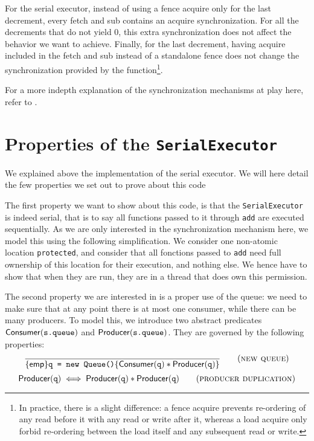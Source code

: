 For the serial executor, instead of using a fence acquire only for the last decrement, every fetch and sub contains an acquire synchronization. For all the decrements that do not yield 0, this extra synchronization does not affect the behavior we want to achieve. Finally, for the last decrement, having acquire included in the fetch and sub instead of a standalone fence does not change the synchronization provided by the function\footnote{In practice, there is a slight difference: a fence acquire prevents re-ordering of any read before it with any read or write after it, whereas a load acquire only forbid re-ordering between the load itself and any subsequent read or write.}.

For a more indepth explanation of the synchronization mechanisms at play here, refer to \cite{fsl}.


\section{Properties of the \texttt{SerialExecutor}}
We explained above the implementation of the serial executor. We will here detail the few properties we set out to prove about this code

The first property we want to show about this code, is that the \texttt{Serial\-Executor} is indeed serial, that is to say all functions passed to it through \texttt{add} are executed sequentially. As we are only interested in the synchronization mechanism here, we model this using the following simplification. We consider one non-atomic location \texttt{protected}, and consider that all fonctions passed to \texttt{add} need full ownership of this location for their execution, and nothing else. We hence have to show that when they are run, they are in a thread that does own this permission.

The second property we are interested in is a proper use of the queue: we need to make sure that at any point there is at most one consumer, while there can be many producers. To model this, we introduce two abstract predicates $\mathsf{Consumer}(\texttt{s.queue})$ and $\mathsf{Producer}(\texttt{s.queue})$. They are governed by the following properties:
\begin{equation}
		\frac{}{\{\mathsf{emp}\} \texttt{q = new Queue()} \{\mathsf{Consumer}(\texttt{q}) * \mathsf{Producer}(\texttt{q})\}} 
		\tag{\textsc{new queue}} 
		\label{eq:nQ}
\end{equation}
\begin{equation}
		\mathsf{Producer}(\texttt{q}) \iff \mathsf{Producer}(\texttt{q}) * \mathsf{Producer}(\texttt{q})
		\tag{\textsc{producer duplication}} 
		\label{eq:prodDup}
\end{equation}


